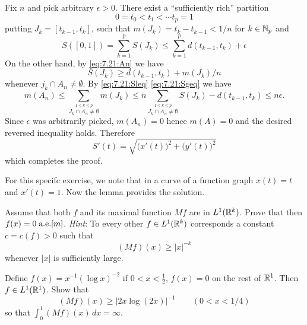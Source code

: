 \begin{enumerate}
\begin{thmproof}
Fix $n$ and pick arbitrary \(\epsilon>0\).
There exist a ``sufficiently rich'' partition 
\begin{equation*}
0 = t_0 < t_1 < \cdots t_p = 1
\end{equation*}
putting \(J_k = [t_{k-1},t_k]\),
such that 
\(m(J_k) = t_k - t_{k-1} < 1/n\) for \(k\in\mathbb{N}_p\) and 
\begin{equation} \label{eq:7.21:Sleq}
S([0,1]) = \sum_{k=1}^p S(J_k) \leq \sum_{k=1}^p d(t_{k-1},t_k) + \epsilon
\end{equation}
On the other hand, by \eqref{eq:7.21:An} we have
\begin{equation} \label{eq:7.21:Sgeq}
S(J_k) \geq d(t_{k-1},t_k) + m(J_k)/n
\end{equation}
whenever \(j_k \cap A_n \neq \emptyset\). 
By \eqref{eq:7.21:Sleq} \eqref{eq:7.21:Sgeq} we have
\newcommand{\sumJkAn}{
            \sum_{\stackrel{1\leq k \leq p}{J_k\cap A_n \neq \emptyset}}}
\begin{equation*}
m(A_n) 
\leq \sumJkAn m(J_k) 
\leq n \sumJkAn S(J_k) - d(t_{k-1},t_k) 
\leq n\epsilon.
\end{equation*}
Since \(\epsilon\) was arbitrarily picked, \(m(A_n) = 0\) 
hence \(m(A) = 0\) and the desired reversed inequality holds.
Therefore
\begin{equation} \label{eq:ex7.21:Sdif}
S'(t) = \sqrt{\bigl(x'(t)\bigr)^2 + \bigl(y'(t)\bigr)^2}
\end{equation}
which completes the proof.
\end{thmproof}

For this specifc exercise, we note that 
in a curve of a function graph
\(x(t)=t\) and \(x'(t)=1\).
Now the lemma provides the solution.


\begin{excopy}
\begin{itemize}
Assume that both $f$ and  its maximal function \(Mf\) are in \(L^1(\mathbb{R}^k)\).
Prove that then \(f(x)=0\;\textrm{a.e.}[m]\).
\emph{Hint}: To every other \(f\in L^1(\mathbb{R}^k)\) corresponds a constant
\(c=c(f)>0\) such that
\begin{equation*}
  (Mf)(x) \geq |x|^{-k}
\end{equation*}
whenever \(|x|\) is sufficiently large.

Define \(f(x) = x^{-1}(\log x)^{-2}\) if \(0<x<\frac{1}{2}\),
\(f(x)=0\) on the rest of \(\mathbb{R}^1\).
Then \(f\in L^1(\mathbb{R}^1)\).
Show that
\begin{equation*}
  (Mf)(x) \geq |2x \log(2x)|^{-1} \qquad (0<x<1/4)
\end{equation*}
so that \(\int_0^1 (Mf)(x)\,dx = \infty\).
\end{itemize}
\end{excopy}


\end{enumerate}
